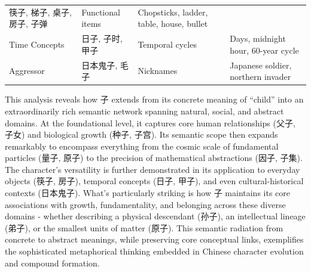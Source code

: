 \begin{longtable}[]{@{}llll@{}}
\begin{minipage}[t]{0.19\columnwidth}
筷子, 梯子, 桌子, 房子, 子弹\strut
\end{minipage} & \begin{minipage}[t]{0.33\columnwidth}\raggedright
Functional items\strut
\end{minipage} & \begin{minipage}[t]{0.19\columnwidth}\raggedright
Chopsticks, ladder, table, house, bullet\strut
\end{minipage}\tabularnewline
\begin{minipage}[t]{0.17\columnwidth}\raggedright
Time Concepts\strut
\end{minipage} & \begin{minipage}[t]{0.19\columnwidth}\raggedright
日子, 子时, 甲子\strut
\end{minipage} & \begin{minipage}[t]{0.33\columnwidth}\raggedright
Temporal cycles\strut
\end{minipage} & \begin{minipage}[t]{0.19\columnwidth}\raggedright
Days, midnight hour, 60-year cycle\strut
\end{minipage}\tabularnewline
\begin{minipage}[t]{0.17\columnwidth}\raggedright
Aggressor\strut
\end{minipage} & \begin{minipage}[t]{0.19\columnwidth}\raggedright
日本鬼子, 毛子\strut
\end{minipage} & \begin{minipage}[t]{0.33\columnwidth}\raggedright
Nicknames\strut
\end{minipage} & \begin{minipage}[t]{0.19\columnwidth}\raggedright
Japanese soldier, northern invader\strut
\end{minipage}\tabularnewline
\bottomrule
\end{longtable}

This analysis reveals how 子 extends from its concrete meaning of
``child'' into an extraordinarily rich semantic network spanning
natural, social, and abstract domains. At the foundational level, it
captures core human relationships (父子, 子女) and biological growth
(种子, 子宫). Its semantic scope then expands remarkably to encompass
everything from the cosmic scale of fundamental particles (量子, 原子)
to the precision of mathematical abstractions (因子, 子集). The
character's versatility is further demonstrated in its application to
everyday objects (筷子, 房子), temporal concepts (日子, 甲子), and even
cultural-historical contexts (日本鬼子). What's particularly striking is
how 子 maintains its core associations with growth, fundamentality, and
belonging across these diverse domains - whether describing a physical
descendant (孙子), an intellectual lineage (弟子), or the smallest units
of matter (原子). This semantic radiation from concrete to abstract
meanings, while preserving core conceptual links, exemplifies the
sophisticated metaphorical thinking embedded in Chinese character
evolution and compound formation.


